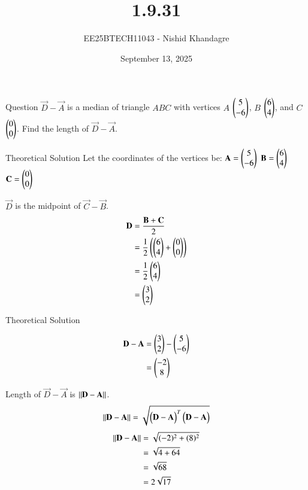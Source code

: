 \documentclass{beamer}
\title
{1.9.31}
\date{September 13, 2025}
\author
{EE25BTECH11043 - Nishid Khandagre}
\begin{document}
\frame{\titlepage}

\begin{frame}{Question}
$\vec{D}-\vec{A}$ is a median of triangle $ABC$ with vertices $A$ $\begin{pmatrix} 5\\-6\end{pmatrix}$, $B$ $\begin{pmatrix} 6\\4 \end{pmatrix}$, and $C$ $\begin{pmatrix} 0\\0 \end{pmatrix}$. Find the length of $\vec{D}-\vec{A}$.
\end{frame}


\begin{frame}{Theoretical Solution}
Let the coordinates of the vertices be:
$\mathbf{A} = \begin{pmatrix}5 \\ -6\end{pmatrix}$
$\mathbf{B} = \begin{pmatrix}6 \\ 4\end{pmatrix}$
$\mathbf{C} = \begin{pmatrix}0 \\ 0\end{pmatrix}$

$\vec{D}$ is the midpoint of $\vec{C}-\vec{B}$.
\begin{align}
\mathbf{D} &= \frac{\mathbf{B} + \mathbf{C}}{2} \\
&= \frac{1}{2}\left(\begin{pmatrix}6 \\ 4\end{pmatrix} + \begin{pmatrix}0 \\ 0\end{pmatrix}\right) \\
&= \frac{1}{2}\begin{pmatrix}6 \\ 4\end{pmatrix} \\
&= \begin{pmatrix}3 \\ 2\end{pmatrix}
\end{align}
\end{frame}

\begin{frame}{Theoretical Solution}

\begin{align}
\mathbf{D}-\mathbf{A} &= \begin{pmatrix}3 \\ 2\end{pmatrix} - \begin{pmatrix}5 \\ -6\end{pmatrix} \\
&= \begin{pmatrix}-2 \\ 8\end{pmatrix}
\end{align}

Length of $\vec{D} - \vec{A}$ is $\left\lVert\mathbf{D}-\mathbf{A}\right\rVert$.
\begin{align}
\left\lVert\mathbf{D}-\mathbf{A}\right\rVert = \sqrt{\begin{pmatrix}\mathbf{D}-\mathbf{A}\end{pmatrix}^T\begin{pmatrix}\mathbf{D} - \mathbf{A}\end{pmatrix}}
\end{align}
\begin{align}
\left\lVert\mathbf{D}-\mathbf{A}\right\rVert &= \sqrt{(-2)^2 + (8)^2} \\
&= \sqrt{4 + 64} \\
&= \sqrt{68} \\
&= 2\sqrt{17}
\end{align}
\end{frame}
\end{document}
